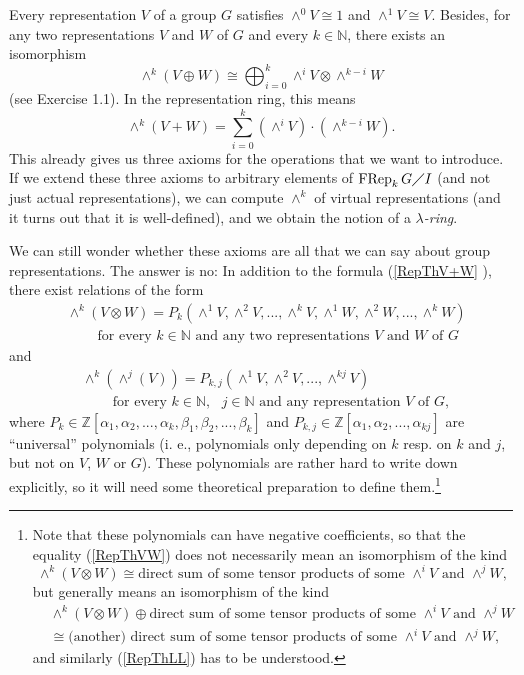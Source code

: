 \documentclass[numbers=enddot,12pt,final,onecolumn,notitlepage]{scrartcl}%
\begin{document}
Every representation $V$ of a group $G$ satisfies $\wedge^{0}V\cong1$ and
$\wedge^{1}V\cong V$. Besides, for any two representations $V$ and $W$ of $G$
and every $k\in\mathbb{N}$, there exists an isomorphism%
\begin{equation}
\wedge^{k}\left(  V\oplus W\right)  \cong\bigoplus_{i=0}^{k}\wedge^{i}%
V\otimes\wedge^{k-i}W \label{RepThV+W}%
\end{equation}
(see Exercise 1.1). In the representation ring, this means%
\[
\wedge^{k}\left(  V+W\right)  =\sum_{i=0}^{k}\left(  \wedge^{i}V\right)
\cdot\left(  \wedge^{k-i}W\right)  .
\]
This already gives us three axioms for the operations that we want to
introduce. If we extend these three axioms to arbitrary elements of
$\operatorname*{FRep}_{k}G\diagup I$ (and not just actual representations), we
can compute $\wedge^{k}$ of virtual representations (and it turns out that it
is well-defined), and we obtain the notion of a $\lambda$\textit{-ring}.

We can still wonder whether these axioms are all that we can say about group
representations. The answer is no: In addition to the formula (\ref{RepThV+W}%
), there exist relations of the form
\begin{align}
&  \wedge^{k}\left(  V\otimes W\right)  =P_{k}\left(  \wedge^{1}V,\wedge
^{2}V,...,\wedge^{k}V,\wedge^{1}W,\wedge^{2}W,...,\wedge^{k}W\right)
\nonumber\\
&  \ \ \ \ \ \ \ \ \ \ \text{for every }k\in\mathbb{N}\text{ and any two
representations }V\text{ and }W\text{ of }G \label{RepThVW}%
\end{align}
and%
\begin{align}
&  \wedge^{k}\left(  \wedge^{j}\left(  V\right)  \right)  =P_{k,j}\left(
\wedge^{1}V,\wedge^{2}V,...,\wedge^{kj}V\right) \nonumber\\
&  \ \ \ \ \ \ \ \ \ \ \text{for every }k\in\mathbb{N},\text{ }j\in
\mathbb{N}\text{ and any representation }V\text{ of }G, \label{RepThLL}%
\end{align}
where $P_{k}\in\mathbb{Z}\left[  \alpha_{1},\alpha_{2},...,\alpha_{k}%
,\beta_{1},\beta_{2},...,\beta_{k}\right]  $ and $P_{k,j}\in\mathbb{Z}\left[
\alpha_{1},\alpha_{2},...,\alpha_{kj}\right]  $ are ``universal'' polynomials
(i. e., polynomials only depending on $k$ resp. on $k$ and $j$, but not on
$V$, $W$ or $G$). These polynomials are rather hard to write down explicitly,
so it will need some theoretical preparation to define them.\footnote{Note
that these polynomials can have negative coefficients, so that the equality
(\ref{RepThVW}) does not necessarily mean an isomorphism of the kind%
\[
\wedge^{k}\left(  V\otimes W\right)  \cong\text{direct sum of some tensor
products of some }\wedge^{i}V\text{ and }\wedge^{j}W,
\]
but generally means an isomorphism of the kind%
\begin{align*}
&  \wedge^{k}\left(  V\otimes W\right)  \oplus\text{direct sum of some tensor
products of some }\wedge^{i}V\text{ and }\wedge^{j}W\\
&  \cong\text{(another) direct sum of some tensor products of some }\wedge
^{i}V\text{ and }\wedge^{j}W,
\end{align*}
and similarly (\ref{RepThLL}) has to be understood.}
\end{document}
